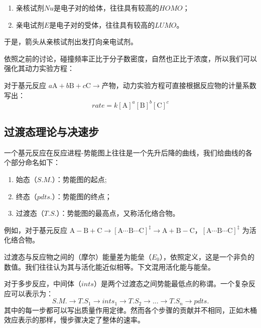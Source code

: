 \begin{definition}[亲核试剂与亲电试剂]
  \begin{enumerate}
    \item 亲核试剂$Nu$是电子对的给体，往往具有较高的$HOMO$；
    \item 亲电试剂$E$是电子对的受体，往往具有较高的$LUMO$。
  \end{enumerate}
\end{definition}
于是，箭头从亲核试剂出发打向亲电试剂。

依照之前的讨论，碰撞频率正比于分子数密度，自然也正比于浓度，所以我们可以强化其动力实验方程：

\begin{proposition}[质量作用定律]
对于基元反应 $a\text{A} + b\text{B} +c\text{C}\rightarrow \text{产物}$，动力实验方程可直接根据反应物的计量系数写出：
$$rate = k[\text{A}]^a[\text{B}]^b[\text{C}]^c$$
\end{proposition}

\subsection{过渡态理论与决速步}

一个基元反应在反应进程-势能图上往往是一个先升后降的曲线，我们给曲线的各个部分命名如下：

\begin{definition}[活化络合物]
\begin{enumerate}
  \item 始态（$S.M.$）：势能图的起点;
  \item 终态（$pdts.$）：势能图的终点；
  \item 过渡态（$T.S.$）：势能图的最高点，又称活化络合物。
\end{enumerate}
\end{definition}
例如，对于基元反应 $\text{A}-\text{B} + \text{C} \rightarrow [\text{A}\cdots \text{B}\cdots \text{C}]^\ddagger \rightarrow \text{A} + \text{B}-\text{C}$，$[\text{A}\cdots \text{B}\cdots \text{C}]^\ddagger$ 为活化络合物。

过渡态与反应物之间的（摩尔）能量差为能垒（$E_0$），依照定义，这是一个非负的数值。我们往往认为其与活化能近似相等。下文混用活化能与能垒。

对于多步反应，中间体（$ints$）是两个过渡态之间势能最低点的称谓。一个复杂反应可以表示为：$$S.M.\longrightarrow T.S_1 \longrightarrow ints_1\longrightarrow T.S_2\longrightarrow ...\longrightarrow T.S_n \longrightarrow pdts.$$其中的每一步都可以写出质量作用定律。然而各个步骤的贡献并不相同，正如木桶效应表示的那样，慢步骤决定了整体的速率。

